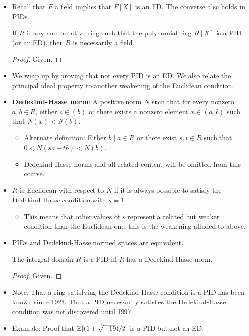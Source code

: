 \documentclass[../notes.tex]{subfiles}
\begin{document}
\begin{itemize}
    \begin{proposition}\label{prp:8.7}
        Every nonzero prime ideal in a PID is a maximal ideal.
        \begin{proof}
            See Lecture 4.3.
        \end{proof}
    \end{proposition}
    \item Recall that $F$ a field implies that $F[X]$ is an ED. The converse also holds in PIDs.
    \begin{corollary}\label{cly:8.8}
        If $R$ is any commutative ring such that the polynomial ring $R[X]$ is a PID (or an ED), then $R$ is necessarily a field.
        \begin{proof}
            Given.
        \end{proof}
    \end{corollary}
    \item We wrap up by proving that not every PID is an ED. We also relate the principal ideal property to another weakening of the Euclidean condition.
    \item \textbf{Dedekind-Hasse norm}: A positive norm $N$ such that for every nonzero $a,b\in R$, either $a\in(b)$ or there exists a nonzero element $x\in(a,b)$ such that $N(x)<N(b)$.
    \begin{itemize}
        \item Alternate definition: Either $b\mid a\in R$ or there exist $s,t\in R$ such that $0<N(sa-tb)<N(b)$.
        \item Dedekind-Hasse norms and all related content will be omitted from this course.
    \end{itemize}
    \item $R$ is Euclidean with respect to $N$ if it is always possible to satisfy the Dedekind-Hasse condition with $s=1$..
    \begin{itemize}
        \item This means that other values of $s$ represent a related but weaker condition than the Euclidean one; this is the weakening alluded to above.
    \end{itemize}
    \item PIDs and Dedekind-Hasse normed spaces are equivalent.
    \begin{proposition}\label{prp:8.9}
        The integral domain $R$ is a PID iff $R$ has a Dedekind-Hasse norm.
        \begin{proof}
            Given.
        \end{proof}
    \end{proposition}
    \item Note: That a ring satisfying the Dedekind-Hasse condition is a PID has been known since 1928. That a PID necessarily satisfies the Dedekind-Hasse condition was not discovered until 1997.
    \item Example: Proof that $\mathbb{Z}[(1+\sqrt{-19})/2]$ is a PID but not an ED.
\end{itemize}
\end{document}
